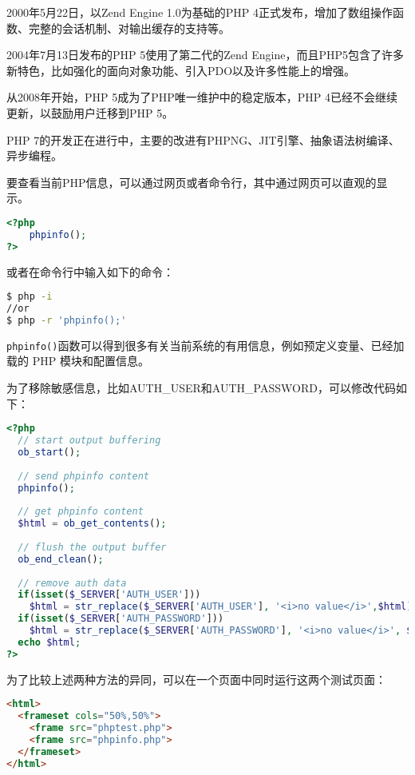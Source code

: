 2000年5月22日，以Zend Engine 1.0为基础的PHP 4正式发布，增加了数组操作函数、完整的会话机制、对输出缓存的支持等。

2004年7月13日发布的PHP 5使用了第二代的Zend Engine，而且PHP5包含了许多新特色，比如强化的面向对象功能、引入PDO以及许多性能上的增强。



从2008年开始，PHP 5成为了PHP唯一维护中的稳定版本，PHP 4已经不会继续更新，以鼓励用户迁移到PHP 5。

PHP 7的开发正在进行中，主要的改进有PHPNG、JIT引擎、抽象语法树编译、异步编程。





要查看当前PHP信息，可以通过网页或者命令行，其中通过网页可以直观的显示。

\begin{lstlisting}[language=PHP]
<?php
	phpinfo();
?>
\end{lstlisting}

或者在命令行中输入如下的命令：

\begin{lstlisting}[language=bash]
$ php -i
//or
$ php -r 'phpinfo();'
\end{lstlisting}

\texttt{phpinfo()}函数可以得到很多有关当前系统的有用信息，例如预定义变量、已经加载的 PHP 模块和配置信息。

为了移除敏感信息，比如AUTH\_USER和AUTH\_PASSWORD，可以修改代码如下：

\begin{lstlisting}[language=PHP]
<?php
  // start output buffering
  ob_start();
  
  // send phpinfo content
  phpinfo();
  
  // get phpinfo content
  $html = ob_get_contents();
  
  // flush the output buffer
  ob_end_clean();
  
  // remove auth data
  if(isset($_SERVER['AUTH_USER']))
    $html = str_replace($_SERVER['AUTH_USER'], '<i>no value</i>',$html);
  if(isset($_SERVER['AUTH_PASSWORD']))
    $html = str_replace($_SERVER['AUTH_PASSWORD'], '<i>no value</i>', $html);
  echo $html;
?>
\end{lstlisting}

为了比较上述两种方法的异同，可以在一个页面中同时运行这两个测试页面：

\begin{lstlisting}[language=HTML]
<html>
  <frameset cols="50%,50%">
    <frame src="phptest.php">
    <frame src="phpinfo.php">
  </frameset>
</html>
\end{lstlisting}

